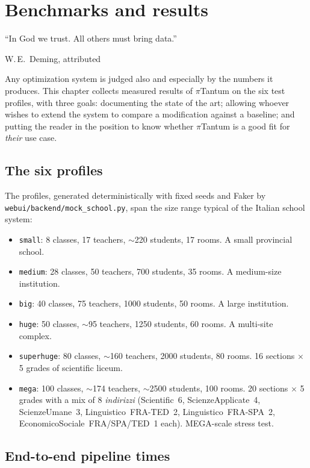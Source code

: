 \chapter{Benchmarks and results}
\label{ch:benchmarks_en}

\epigraph{``In God we trust. All others must bring data.''}{W.\,E.\
Deming, attributed}

Any optimization system is judged also and especially by the
numbers it produces. This chapter collects measured results of
$\pi$Tantum on the six test profiles, with three goals:
documenting the state of the art; allowing whoever wishes to
extend the system to compare a modification against a baseline;
and putting the reader in the position to know whether
$\pi$Tantum is a good fit for \emph{their} use case.

\section{The six profiles}

The profiles, generated deterministically with fixed seeds and
Faker by \texttt{webui/backend/mock\_school.py}, span the size
range typical of the Italian school system:

\begin{itemize}
\item \texttt{small}: 8 classes, 17 teachers, $\sim$220
  students, 17 rooms. A small provincial school.
\item \texttt{medium}: 28 classes, 50 teachers, 700 students,
  35 rooms. A medium-size institution.
\item \texttt{big}: 40 classes, 75 teachers, 1000 students,
  50 rooms. A large institution.
\item \texttt{huge}: 50 classes, $\sim$95 teachers, 1250
  students, 60 rooms. A multi-site complex.
\item \texttt{superhuge}: 80 classes, $\sim$160 teachers, 2000
  students, 80 rooms. 16 sections $\times$ 5 grades of
  scientific liceum.
\item \texttt{mega}: 100 classes, $\sim$174 teachers,
  $\sim$2500 students, 100 rooms. 20 sections $\times$ 5
  grades with a mix of 8 \emph{indirizzi} (Scientific~6,
  ScienzeApplicate~4, ScienzeUmane~3, Linguistico~FRA-TED~2,
  Linguistico~FRA-SPA~2, EconomicoSociale~FRA/SPA/TED~1
  each). MEGA-scale stress test.
\end{itemize}

\section{End-to-end pipeline times}

